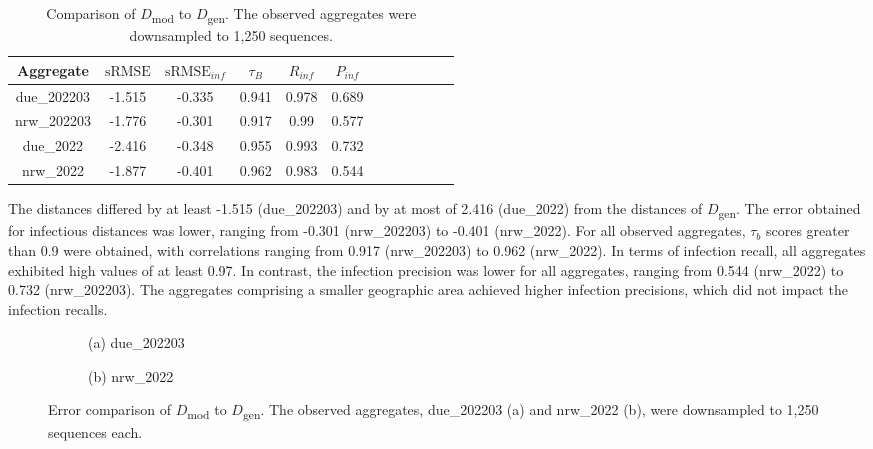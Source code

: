 \begin{table}[ht!]
        \centering
        \caption[Comparison of $D$\textsubscript{mod} to $D$\textsubscript{gen}]{Comparison of $D$\textsubscript{mod} to $D$\textsubscript{gen}. The observed aggregates were downsampled to 1,250 sequences.}
        \begin{threeparttable}
        \begin{tabular}{ Sc | Sc Sc Sc Sc Sc } 
        Aggregate & $\text{sRMSE}$ & $\text{sRMSE}_{inf}$ & $\tau_B$ & $R_{inf}$ & $P_{inf}$ \\
        \hline\hline
        due\_202203 & -1.515 & -0.335 & 0.941 & 0.978 & 0.689 \\
        nrw\_202203 & -1.776 & -0.301 & 0.917 & 0.99 & 0.577 \\
        due\_2022 & -2.416 & -0.348 & 0.955 & 0.993 & 0.732 \\
        nrw\_2022 & -1.877 & -0.401 & 0.962 & 0.983 & 0.544\\
        \end{tabular}               
        \end{threeparttable}
        \label{table:algorithm_optimization_evaluation}
\end{table}
        
The distances differed by at least -1.515 (due\_202203) and by at most of 2.416 (due\_2022) from the distances of $D$\textsubscript{gen}. The error obtained for infectious distances was lower, ranging from -0.301 (nrw\_202203) to -0.401 (nrw\_2022). For all observed aggregates, $\tau_b$ scores greater than 0.9 were obtained, with correlations ranging from 0.917 (nrw\_202203) to 0.962 (nrw\_2022). In terms of infection recall, all aggregates exhibited high values of at least 0.97. In contrast, the infection precision was lower for all aggregates, ranging from 0.544 (nrw\_2022) to 0.732 (nrw\_202203). The aggregates comprising a smaller geographic area achieved higher infection precisions, which did not impact the infection recalls.

\begin{figure}[H]
  \centering
  \begin{subfigure}[b]{0.45\textwidth}
    
    \caption*{(a) due\_202203}
  \end{subfigure}
  \hfill
  \begin{subfigure}[b]{0.45\textwidth}
    
    \caption*{(b) nrw\_2022}
  \end{subfigure}
  \caption[Error comparison of $D$\textsubscript{mod} to $D$\textsubscript{gen}] {Error comparison of $D$\textsubscript{mod} to $D$\textsubscript{gen}. The observed aggregates, due\_202203 (a) and nrw\_2022 (b), were downsampled to 1,250 sequences each.}
  \label{fig:optimization_offset}
\end{figure}

